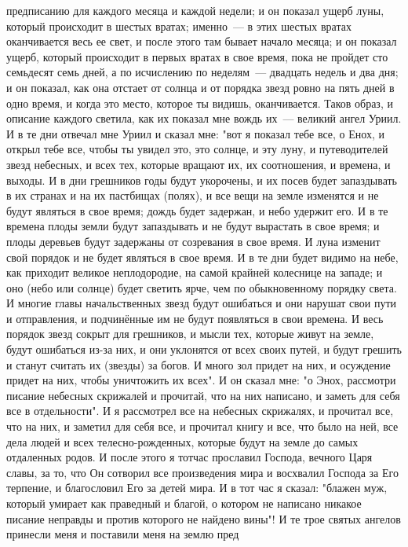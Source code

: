 предписанию для каждого месяца и каждой недели; и он показал ущерб луны,
который происходит в шестых вратах; именно~--- в этих шестых вратах оканчивается
весь ее свет, и после этого там бывает начало месяца; и он показал ущерб,
который происходит в первых вратах в свое время, пока не пройдет сто семьдесят
семь дней, а по исчислению по неделям~--- двадцать недель и два дня; и он
показал, как она отстает от солнца и от порядка звезд ровно на пять дней в одно
время, и когда это место, которое ты видишь, оканчивается.
Таков образ, и описание каждого светила, как их показал мне вождь их~---
великий ангел Уриил.
И в те дни отвечал мне Уриил и сказал мне: "вот я показал тебе
все, о Енох, и открыл тебе все, чтобы ты увидел это, это солнце, и эту луну, и
путеводителей звезд небесных, и всех тех, которые вращают их, их соотношения, и
времена, и выходы.
И в дни грешников годы будут укорочены, и их посев будет запаздывать в
их странах и на их пастбищах (полях), и все вещи на земле изменятся и не будут
являться в свое время; дождь будет задержан, и небо удержит его.
И в те времена плоды земли будут запаздывать и не будут вырастать в
свое время; и плоды деревьев будут задержаны от созревания в свое время.
И луна изменит свой порядок и не будет являться в свое время.
И в те дни будет видимо на небе, как приходит великое неплодородие, на
самой крайней колеснице на западе; и оно (небо или солнце) будет светить ярче,
чем по обыкновенному порядку света.
И многие главы начальственных звезд будут ошибаться и они нарушат свои
пути и отправления, и подчинённые им не будут появляться в свои времена.
И весь порядок звезд сокрыт для грешников, и мысли тех, которые живут
на земле, будут ошибаться из-за них, и они уклонятся от всех своих путей, и
будут грешить и станут считать их (звезды) за богов.
И много зол придет на них, и осуждение придет на них, чтобы уничтожить
их всех".
И он сказал мне: "о Энох, рассмотри писание небесных скрижалей и
прочитай, что на них написано, и заметь для себя все в отдельности".
И я рассмотрел все на небесных скрижалях, и прочитал все, что на них,
и заметил для себя все, и прочитал книгу и все, что было на ней, все дела людей
и всех телесно-рожденных, которые будут на земле до самых отдаленных родов.
И после этого я тотчас прославил Господа, вечного Царя славы, за то,
что Он сотворил все произведения мира и восхвалил Господа за Его терпение, и
благословил Его за детей мира.
И в тот час я сказал: "блажен муж, который умирает как праведный и
благой, о котором не написано никакое писание неправды и против которого не
найдено вины"!
И те трое святых ангелов принесли меня и поставили меня на землю пред

